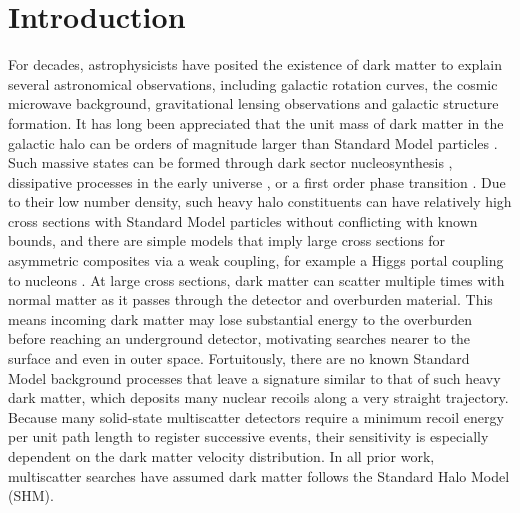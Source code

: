 \documentclass[12pt]{article}
\begin{document}
\section{Introduction}
For decades, astrophysicists have posited the existence of dark matter to explain several astronomical observations, including galactic rotation curves, the cosmic microwave background, gravitational lensing observations and galactic structure formation.
It has long been appreciated that the unit mass of dark matter in the galactic halo can be orders of magnitude larger than Standard Model particles \cite{Witten:1984rs,Farhi:1984qu,DeRujula:1984axn,Goodman:1984dc,Drukier:1986tm,Nussinov:1985xr,Bagnasco:1993st,Alves:2009nf,Kribs:2009fy}. Such massive states can be formed through dark sector nucleosynthesis \cite{Krnjaic:2014xza,Wise:2014jva,Gresham:2017cvl,Acevedo:2020avd}, dissipative processes in the early universe \cite{Buckley:2017ttd,Chang:2018bgx,Bramante:2023ddr,Bramante:2024pyc,Lu:2024xnb}, or a first order phase transition \cite{Witten:1984rs,Bai:2018dxf}. 
Due to their low number density, such heavy halo constituents can have relatively high cross sections with Standard Model particles without conflicting with known bounds, and there are simple models that imply large cross sections for asymmetric composites via a weak coupling, for example a Higgs portal coupling to nucleons \cite{Acevedo:2021kly,Acevedo:2024lyr,Bleau:2025klr}. At large cross sections, dark matter can scatter multiple times with normal matter as it passes through the detector and overburden material. This means incoming dark matter may lose substantial energy to the overburden before reaching an underground detector, motivating searches nearer to the surface and even in outer space. Fortuitously, there are no known Standard Model background processes that leave a signature similar to that of such heavy dark matter, which deposits many nuclear recoils along a very straight trajectory. Because many solid-state multiscatter detectors require a minimum recoil energy per unit path length to register successive events, their sensitivity is especially dependent on the dark matter velocity distribution. In all prior work, multiscatter searches have assumed dark matter follows the Standard Halo Model (SHM).
\end{document}

